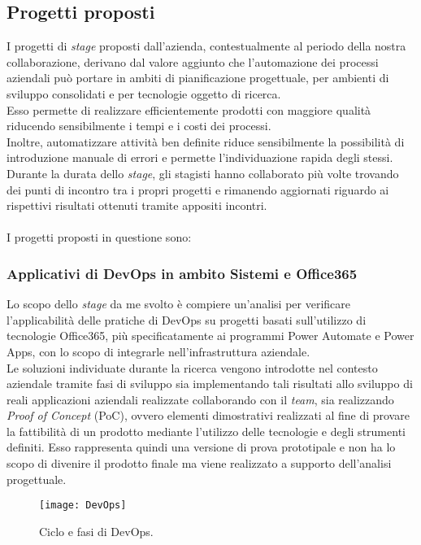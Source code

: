 \subsection{Progetti proposti}
I progetti di \emph{stage} proposti dall'azienda, contestualmente al periodo della nostra collaborazione, derivano dal valore aggiunto che l'automazione dei processi aziendali può portare in ambiti di pianificazione progettuale, per ambienti di sviluppo consolidati e per tecnologie oggetto di ricerca.\\
Esso permette di realizzare efficientemente prodotti con maggiore qualità riducendo sensibilmente i tempi e i costi dei processi.\\
Inoltre, automatizzare attività ben definite riduce sensibilmente la possibilità di introduzione manuale di errori e permette l'individuazione rapida degli stessi.\\
Durante la durata dello \emph{stage}, gli stagisti hanno collaborato più volte trovando dei punti di incontro tra i propri progetti e rimanendo aggiornati riguardo ai rispettivi risultati ottenuti tramite appositi incontri.\\\\
I progetti proposti in questione sono: 

\subsubsection*{Applicativi di DevOps in ambito Sistemi e Office365}
\label{mioStage}
Lo scopo dello \emph{stage} da me svolto è compiere un'analisi per verificare l'applicabilità delle pratiche di \gls{DevOps} su progetti basati sull'utilizzo di tecnologie Office365, più specificatamente ai programmi Power Automate e Power Apps, con lo scopo di integrarle nell'infrastruttura aziendale.\\
Le soluzioni individuate durante la ricerca vengono introdotte nel contesto aziendale tramite fasi di sviluppo sia implementando tali risultati allo sviluppo di reali applicazioni aziendali realizzate collaborando con il \emph{team}, sia realizzando \emph{Proof of Concept} (PoC), ovvero elementi dimostrativi realizzati al fine di provare la fattibilità di un prodotto mediante l'utilizzo delle tecnologie e degli strumenti definiti. Esso rappresenta quindi una versione di prova prototipale e non ha lo scopo di divenire il prodotto finale ma viene realizzato a supporto dell'analisi progettuale.
\begin{figure}[htbp] 
    \centering 
    \texttt{[image: DevOps]}
    \caption{Ciclo e fasi di DevOps.} 
    \label{fig:DevOps}
\end{figure}

